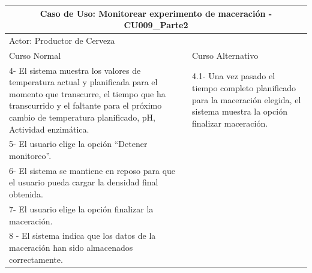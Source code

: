     \begin{minipage}{0.95\textwidth}
    \begin{center}
    \begin{tabularx}{\textwidth}{ | X | X |}
    \hline
        \multicolumn{2}{|c|}{\textbf{Caso de Uso: Monitorear experimento de maceración - CU009\_Parte2}} \\
        \hline
        \multicolumn{2}{|l|}{Actor: Productor de Cerveza} \\
        \hline
    \hline
        Curso Normal & Curso Alternativo \\
        \hline
        4- El sistema muestra los valores de temperatura actual y planificada para el momento que transcurre, el tiempo que ha transcurrido y el faltante para el próximo cambio de temperatura planificado, pH, Actividad enzimática. & 4.1- Una vez pasado el tiempo completo planificado para la maceración elegida, el sistema muestra la opción finalizar maceración.
        \\
        \hline
        5- El usuario elige la opción “Detener monitoreo”. &
        \\
        \hline
        6- El sistema se mantiene en reposo para que el usuario pueda cargar la densidad final obtenida. &
        \\
        \hline
        7- El usuario elige la opción finalizar la maceración. &
        \\
        \hline
        8 - El sistema indica que los datos de la maceración han sido almacenados correctamente. &
        \\
        \hline
    \end{tabularx}
    \label{CU009_b}
    \end{center}
    \end{minipage}
    
